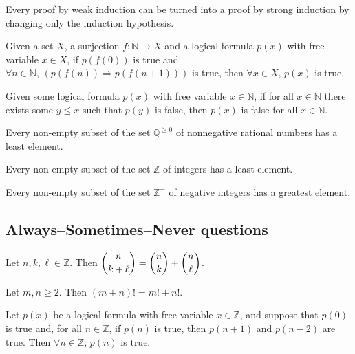 \begin{chapex} %
Every proof by weak induction can be turned into a proof by strong induction by changing only the induction hypothesis.
\end{chapex}

\begin{chapex} %
Given a set $X$, a surjection $f : \mathbb{N} \to X$ and a logical formula $p(x)$ with free variable $x \in X$, if $p(f(0))$ is true and $\forall n \in \mathbb{N},\, (p(f(n)) \Rightarrow p(f(n+1)))$ is true, then $\forall x \in X,\, p(x)$ is true.
\end{chapex}

\begin{chapex} %
Given some logical formula $p(x)$ with free variable $x \in \mathbb{N}$, if for all $x \in \mathbb{N}$ there exists some $y \le x$ such that $p(y)$ is false, then $p(x)$ is false for all $x \in \mathbb{N}$.
\end{chapex}

\begin{chapex} %
Every non-empty subset of the set $\mathbb{Q}^{\ge 0}$ of nonnegative rational numbers has a least element. 
\end{chapex}

\begin{chapex} %
Every non-empty subset of the set $\mathbb{Z}$ of integers has a least element.
\end{chapex}

\begin{chapex} %
\label{cqInductionTFEnd}
Every non-empty subset of the set $\mathbb{Z}^{-}$ of negative integers has a greatest element.
\end{chapex}

\subsection*{Always--Sometimes--Never questions}


\begin{chapex} %
\label{cqInductionASNBegin}
Let $n,k,\ell \in \mathbb{Z}$. Then $\dbinom{n}{k+\ell} = \dbinom{n}{k} + \dbinom{n}{\ell}$.
\end{chapex}

\begin{chapex} %
Let $m,n \ge 2$. Then $(m+n)! = m!+n!$.
\end{chapex}

\begin{chapex} %
\label{cqInductionASNEnd}
Let $p(x)$ be a logical formula with free variable $x \in \mathbb{Z}$, and suppose that $p(0)$ is true and, for all $n \in \mathbb{Z}$, if $p(n)$ is true, then $p(n+1)$ and $p(n-2)$ are true. Then $\forall n \in \mathbb{Z},\, p(n)$ is true.
\end{chapex}